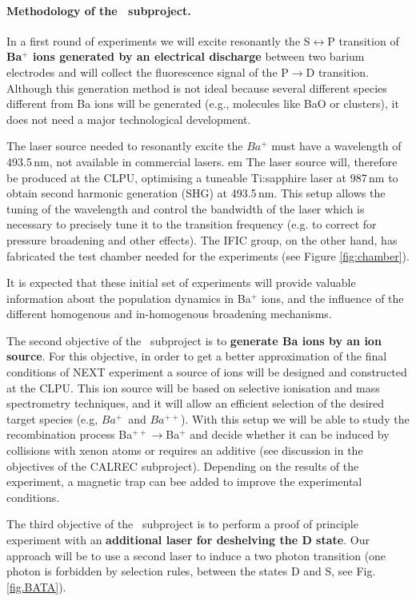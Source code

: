 \paragraph{Methodology of the \BATA\ subproject.}

In a first round of experiments we will excite resonantly the S$\leftrightarrow$P transition of {\bf Ba$^+$ ions generated by an electrical discharge} between two barium electrodes and will collect the fluorescence signal of the P$\rightarrow$D transition. Although this generation method is not ideal because several different species different from Ba ions will be generated (e.g., molecules like BaO or clusters), it does not need a major technological development. 

The laser source needed to resonantly excite the $Ba^{+}$ must have a wavelength of 493.5\,nm, not available in commercial lasers. {em The laser source will, therefore be produced at the CLPU}, optimising a tuneable Ti:sapphire laser at 987\,nm to obtain second harmonic generation (SHG) at 493.5\,nm. This setup allows the tuning of the wavelength and control the bandwidth of the laser which is necessary to precisely tune it to the transition frequency (e.g. to correct for pressure broadening and other effects). The IFIC group, on the other hand, has fabricated the test chamber needed for the experiments 
(see Figure \ref{fig:chamber}). 

It is expected that these initial set of experiments will provide valuable information about the population dynamics in Ba$^+$ ions, and the influence of the different homogenous and in-homogenous broadening mechanisms. 

The second objective of the \BATA\ subproject is to {\bf generate Ba ions by an ion source}. For this objective, in order to get a better approximation of the final conditions of NEXT experiment a source of ions will be designed and constructed at the CLPU. This ion source will be based on selective ionisation and mass spectrometry techniques, and it will allow an efficient selection of the desired target species (e.g, $Ba^{+}$~and $Ba^{++}$). With this setup we will be able to study the recombination process Ba$^{++}\rightarrow$Ba$^{+}$ and decide whether it can be induced by collisions with xenon atoms or requires an additive (see discussion in the objectives of the CALREC subproject). Depending on the results of the experiment, a magnetic trap can bee added to improve the experimental conditions. 

The third objective of the \BATA\ subproject is to perform a proof of principle experiment with an {\bf additional laser for deshelving the D state}. Our approach will be to use a second laser to induce a two photon transition (one photon is forbidden by selection rules, between the states D and S, see Fig.\,\ref{fig.BATA}). 

